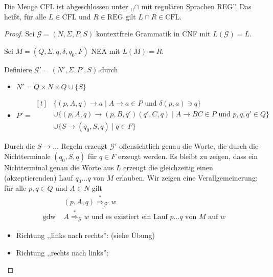 \begin{Satz} %
	Die Menge \ac{CFL} ist abgeschlossen unter ,,$\cap$ mit regulären Sprachen REG''.
  Das heißt, für alle $L \in \mathrm{CFL}$ und $R \in \mathrm{REG}$ gilt $L \cap R \in \mathrm{CFL}$.
\end{Satz}
\begin{proof}
  Sei $\mathcal{G} = (N, \Sigma, P, S)$ kontextfreie Grammatik in CNF mit $L(\mathcal{G}) = L$.

  Sei $M = (Q, \Sigma, q, \delta, q_0, F)$ NEA mit $L(M) = R$.

  Definiere $\mathcal{G}' = (N', \Sigma, P', S)$ durch
  \begin{itemize}
  \item[] $N' = Q \times N \times Q \cup \{S\}$
  \item[] $P' =
    \begin{aligned}[t]
      &\{ (p, A, q) \to a \mid A \to a \in P \text{ und } \delta(p,a) \ni q \} \\
      &\cup \{ (p, A, q) \to (p,B,q')(q',C,q) \mid A \to BC \in P \text{ und } p,q,q' \in Q\} \\
      &\cup \{ S \to (q_0, S, q) \mid q \in F \}
    \end{aligned}
    $
  \end{itemize}
  Durch die $S \to \ldots$ Regeln erzeugt $\mathcal{G}'$ offensichtlich genau die Worte, die durch die Nichtterminale $(q_0, S, q)$ für $q \in F$ erzeugt werden.
  Es bleibt zu zeigen, dass ein Nichtterminal genau die Worte aus $L$ erzeugt die gleichzeitig einen (akzeptierenden) Lauf $q_0\ldots q$ von $M$ erlauben.
  Wir zeigen eine Verallgemeinerung: für alle $p,q \in Q$ und $A \in N$ gilt
  \begin{align*}
    &(p,A,q) \stackrel{*}{\Longrightarrow}_{\mathcal{G}'} w \\
    \text{ gdw } & A \stackrel{*}{\Longrightarrow}_{\mathcal{G}} w \text{ und es existiert ein Lauf } p\ldots q \text{ von $M$ auf $w$}
  \end{align*}
  \begin{itemize}
  \item Richtung ,,links nach rechts'': (siehe Übung)
  \item Richtung ,,rechts nach links'':


\end{itemize}
\end{proof}
